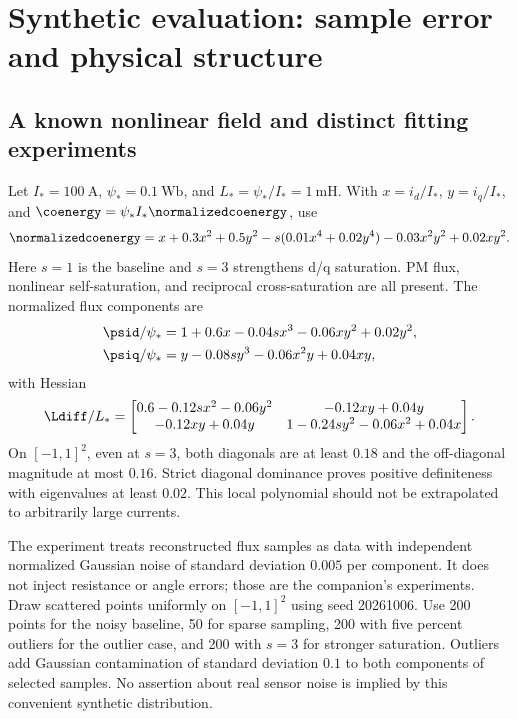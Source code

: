 \section{Synthetic evaluation: sample error and physical structure}
\label{sec:synthetic}
\subsection{A known nonlinear field and distinct fitting experiments}
Let $I_*=\SI{100}{\ampere}$, $\psi_*=\SI{0.1}{\weber}$, and
$L_*=\psi_*/I_*=\SI{1}{\milli\henry}$. With $x=i_d/I_*$, $y=i_q/I_*$,
and $\coenergy=\psi_*I_*\normalizedcoenergy$, use
\begin{equation}
 \normalizedcoenergy=x+0.3x^2+0.5y^2
      -s(0.01x^4+0.02y^4)-0.03x^2y^2+0.02xy^2.
 \label{eq:synthetic-energy}
\end{equation}
Here $s=1$ is the baseline and $s=3$ strengthens d/q saturation. PM flux,
nonlinear self-saturation, and reciprocal cross-saturation are all present.
The normalized flux components are
\begin{align}
 \psid/\psi_*&=1+0.6x-0.04s x^3-0.06xy^2+0.02y^2,\\
 \psiq/\psi_*&=y-0.08s y^3-0.06x^2y+0.04xy,
\end{align}
with Hessian
\begin{equation}
 \Ldiff/L_*=
 \begin{bmatrix}
 0.6-0.12s x^2-0.06y^2&-0.12xy+0.04y\\
 -0.12xy+0.04y&1-0.24s y^2-0.06x^2+0.04x
 \end{bmatrix}.
\end{equation}
On $[-1,1]^2$, even at $s=3$, both diagonals are at least $0.18$ and
the off-diagonal magnitude at most $0.16$. Strict diagonal dominance proves
positive definiteness with eigenvalues at least $0.02$. This local polynomial
should not be extrapolated to arbitrarily large currents.

The experiment treats reconstructed flux samples as data with independent
normalized Gaussian noise of standard deviation $0.005$ per component. It
does not inject resistance or angle errors; those are the companion's
experiments. Draw scattered points uniformly on $[-1,1]^2$ using seed
20261006. Use 200 points for the noisy baseline, 50 for sparse sampling,
200 with five percent outliers for the outlier case, and 200 with $s=3$ for
stronger saturation. Outliers add Gaussian contamination of standard deviation
$0.1$ to both components of selected samples. No assertion about real sensor
noise is implied by this convenient synthetic distribution.

